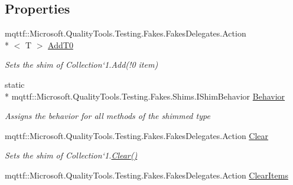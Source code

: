 \subsection*{Properties}
\begin{DoxyCompactItemize}
\item 
mqttf\-::\-Microsoft.\-Quality\-Tools.\-Testing.\-Fakes.\-Fakes\-Delegates.\-Action\\*
$<$ T $>$ \hyperlink{class_system_1_1_collections_1_1_object_model_1_1_fakes_1_1_shim_collection_3_01_t_01_4_a450e4a7898944def354ed500c8f8f4d1}{Add\-T0}
\begin{DoxyCompactList}\small\item\em Sets the shim of Collection`1.Add(!0 item)\end{DoxyCompactList}\item 
static \\*
mqttf\-::\-Microsoft.\-Quality\-Tools.\-Testing.\-Fakes.\-Shims.\-I\-Shim\-Behavior \hyperlink{class_system_1_1_collections_1_1_object_model_1_1_fakes_1_1_shim_collection_3_01_t_01_4_a154564501027f5273d8077e1aff30e39}{Behavior}
\begin{DoxyCompactList}\small\item\em Assigns the behavior for all methods of the shimmed type\end{DoxyCompactList}\item 
mqttf\-::\-Microsoft.\-Quality\-Tools.\-Testing.\-Fakes.\-Fakes\-Delegates.\-Action \hyperlink{class_system_1_1_collections_1_1_object_model_1_1_fakes_1_1_shim_collection_3_01_t_01_4_a9647571e0623a1ef04d2ac68cd075d87}{Clear}
\begin{DoxyCompactList}\small\item\em Sets the shim of Collection`1.\hyperlink{class_system_1_1_collections_1_1_object_model_1_1_fakes_1_1_shim_collection_3_01_t_01_4_a9647571e0623a1ef04d2ac68cd075d87}{Clear()}\end{DoxyCompactList}\item 
mqttf\-::\-Microsoft.\-Quality\-Tools.\-Testing.\-Fakes.\-Fakes\-Delegates.\-Action \hyperlink{class_system_1_1_collections_1_1_object_model_1_1_fakes_1_1_shim_collection_3_01_t_01_4_af7ac9785ca2aaef2bff673b7685920c5}{Clear\-Items}

\end{DoxyCompactItemize}
